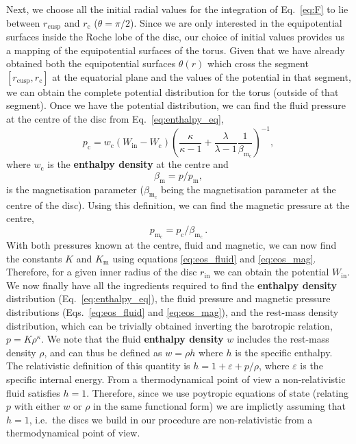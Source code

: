 \documentclass{aa}
\begin{document}
Next, we choose all the initial radial values for the integration of Eq.~\eqref{eq:F} to lie between $r_{\mathrm{cusp}}$ and $r_{\mathrm{c}}$ ($\theta = \pi / 2$). Since we are only interested in the equipotential surfaces inside the Roche lobe of the disc, our choice of initial values provides us a mapping of the equipotential surfaces of the torus. Given that we have already obtained both the equipotential surfaces $\theta(r)$ which cross the segment $[r_{\mathrm{cusp}}, r_{\mathrm{c}}]$ at the equatorial plane and the values of the potential in that segment, we can obtain the complete potential distribution for the torus (outside of that segment). Once we have the potential distribution, we can find the fluid pressure at the centre of the disc from Eq.~\eqref{eq:enthalpy_eq},
\begin{equation}
p_{\mathrm{c}} = w_{\mathrm{c}}(W_{\mathrm{in}} - W_{\mathrm{c}})\left(\frac{\kappa}{\kappa - 1} + \frac{\lambda
}{\lambda
 - 1}\frac{1}{\beta_{\mathrm{m}_{\mathrm{c}}}}\right)^{-1},
\end{equation}
where $w_{\mathrm{c}}$ is the {\bf enthalpy density} at the centre and
\begin{equation}
\label{eq:beta_eq}
\beta_{\mathrm{m}} = p/p_{\mathrm{m}},
\end{equation}
is the magnetisation parameter ($\beta_{\mathrm{m}_{\mathrm{c}}}$ being the magnetisation parameter at the centre of the disc). Using this definition, we can find the magnetic pressure at the centre,
\begin{equation}
p_{\mathrm{m_{\mathrm{c}}}} = p_{\mathrm{c}}/\beta_{\mathrm{m}_{\mathrm{c}}}\,.
\end{equation}
With both pressures known at the centre, fluid and magnetic, we can now find the constants $K$ and $K_{\mathrm{m}}$ using equations \eqref{eq:eos_fluid} and \eqref{eq:eos_mag}. Therefore, for a given inner radius of the disc $r_{\mathrm{in}}$ we can obtain the potential $W_{\mathrm{in}}$. We now finally have all the ingredients required to find the {\bf enthalpy density} distribution (Eq.~\eqref{eq:enthalpy_eq}), the fluid pressure and magnetic pressure distributions (Eqs.~\eqref{eq:eos_fluid} and \eqref{eq:eos_mag}), and the rest-mass density distribution, which can be trivially obtained inverting the barotropic relation, $p = K \rho^{\kappa}$. We note that the fluid {\bf enthalpy density} $w$ includes the rest-mass density $\rho$, and can thus be defined as $w=\rho h$ where $h$ is the specific enthalpy. The relativistic definition of this quantity is $h=1+\varepsilon+p/\rho$, where $\varepsilon$ is
the specific internal energy. From a thermodynamical point of view a non-relativistic fluid satisfies $h=1$. Therefore,
since we use poytropic equations of state (relating $p$ with either $w$ or $\rho$ in the same functional form) we are
implictly assuming that $h=1$, i.e.~the discs we build in our procedure are non-relativistic from a thermodynamical point of view.
\end{document}
